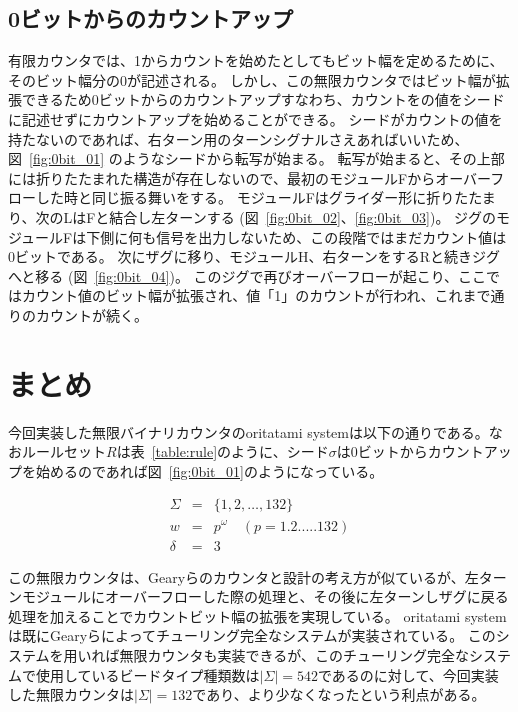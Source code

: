 \documentclass[a4,11pt]{article}
\begin{document}
\subsection{0ビットからのカウントアップ}
有限カウンタでは、1からカウントを始めたとしてもビット幅を定めるために、そのビット幅分の0が記述される。
しかし、この無限カウンタではビット幅が拡張できるため0ビットからのカウントアップすなわち、カウントをの値をシードに記述せずにカウントアップを始めることができる。
シードがカウントの値を持たないのであれば、右ターン用のターンシグナルさえあればいいため、図~\ref{fig:0bit_01}
のようなシードから転写が始まる。
転写が始まると、その上部には折りたたまれた構造が存在しないので、最初のモジュールFからオーバーフローした時と同じ振る舞いをする。
モジュールFはグライダー形に折りたたまり、次のLはFと結合し左ターンする (図~\ref{fig:0bit_02}、\ref{fig:0bit_03})。
ジグのモジュールFは下側に何も信号を出力しないため、この段階ではまだカウント値は0ビットである。
次にザグに移り、モジュールH、右ターンをするRと続きジグへと移る (図~\ref{fig:0bit_04})。
このジグで再びオーバーフローが起こり、ここではカウント値のビット幅が拡張され、値「1」のカウントが行われ、これまで通りのカウントが続く。




\section{まとめ}
今回実装した無限バイナリカウンタのoritatami systemは以下の通りである。なおルールセット$R$は表~\ref{table:rule}のように、シード$\sigma$は0ビットからカウントアップを始めるのであれば図~\ref{fig:0bit_01}のようになっている。

\begin{eqnarray*}
\Sigma &=& \{ 1,2, \ldots , 132\}\\
w &=& p^\omega \quad (p= 1.2.....132)\\
\delta &=& 3
\end{eqnarray*}


この無限カウンタは、Gearyらのカウンタと設計の考え方が似ているが、左ターンモジュールにオーバーフローした際の処理と、その後に左ターンしザグに戻る処理を加えることでカウントビット幅の拡張を実現している。
oritatami systemは既にGearyらによってチューリング完全なシステムが実装されている\cite{GeMeScSe2018}。
このシステムを用いれば無限カウンタも実装できるが、このチューリング完全なシステムで使用しているビードタイプ種類数は$|\Sigma| = 542$であるのに対して、今回実装した無限カウンタは$|\Sigma| = 132$であり、より少なくなったという利点がある。
\end{document}
